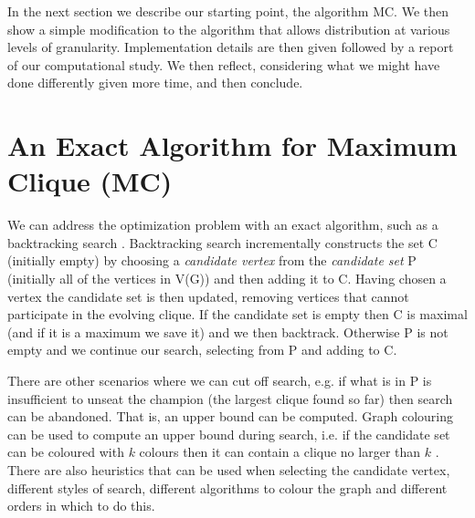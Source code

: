 \documentclass{l4proj}
\begin{document}
In the next section we describe our starting point, the algorithm MC. We then show a simple modification to the algorithm
that allows distribution at various levels of granularity. Implementation details are then given followed by a 
report of our computational study. We then reflect, considering what we might have done differently given more time, and then conclude.

%
\chapter{An Exact Algorithm for Maximum Clique (MC)}
\label{sec:mcBin}
\vspace{-1.5mm}
We can address the optimization problem with an exact algorithm,
such as a backtracking search
\cite{fahle,regin2003,wood97,carraghanPardalos90,pardalosRodgers92,prjo2002,segundo2011,segundo2011b,Konc_Janezic_2007,tomita2003,tomita2010,aaai2010,carmoZuge}.
Backtracking search incrementally constructs the set C (initially empty) by choosing a \emph{candidate vertex}
from  the \emph{candidate set} P (initially all of the vertices in V(G)) and then adding it to C.
Having chosen a vertex the candidate set is then updated, removing vertices
that cannot participate in the evolving clique. If the candidate set is empty then C is maximal (and if it is a maximum we save it)
and we then backtrack. Otherwise P is not empty and we continue our search, selecting from P and adding to C.

There are other scenarios where we can cut off search, e.g. if what is in P is insufficient
to unseat the champion (the largest clique found so far) then search can be abandoned. That is, an upper bound can be computed.
Graph colouring can be used to compute an upper
bound during search, i.e. if the candidate set can be coloured with $k$ colours then it can contain a clique no larger than $k$
\cite{wood97,fahle,segundo2011,Konc_Janezic_2007,tomita2003,tomita2010}. There are also heuristics that can be used when selecting
the candidate vertex, different styles of search, different algorithms to colour the graph and different
orders in which to do this.
\end{document}
